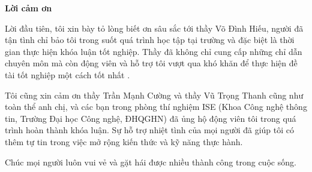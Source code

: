 \begin{center}
\textbf{\large{Lời cảm ơn}	}
\end{center}

Lời đầu tiên, tôi xin bày tỏ lòng biết ơn sâu sắc tới thầy Võ Đình Hiếu, người đã tận tình chỉ bảo tôi trong suốt quá trình học tập tại trường và đặc biệt là thời gian thực hiện khóa luận tốt nghiệp.
Thầy đã không chỉ cung cấp những chỉ dẫn chuyên môn mà còn động viên và hỗ trợ tôi vượt qua khó khăn để thực hiện đề tài tốt nghiệp một cách tốt nhất .

Tôi cũng xin cảm ơn thầy Trần Mạnh Cường và thầy Vũ Trọng Thanh cũng như toàn thể anh chị, và các bạn trong phòng thí nghiệm ISE (Khoa Công nghệ thông tin, Trường Đại học Công nghệ, ĐHQGHN) đã ủng hộ động viên tôi trong quá trình hoàn thành khóa luận.
Sự hỗ trợ nhiệt tình của mọi người đã giúp tôi có thêm tự tin trong việc mở rộng kiến thức và kỹ năng thực hành.

Chúc mọi người luôn vui vẻ và gặt hái được nhiều thành công trong cuộc sống.

